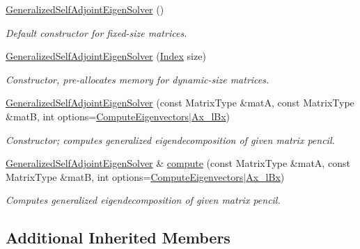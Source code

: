 \begin{DoxyCompactItemize}
\hyperlink{group___eigenvalues___module_a501effdbf722c0609ea05ff3fd4cc721}{Generalized\+Self\+Adjoint\+Eigen\+Solver} ()
\begin{DoxyCompactList}\small\item\em Default constructor for fixed-\/size matrices. \end{DoxyCompactList}\item 
\hyperlink{group___eigenvalues___module_aac849f01a8c6148c645acd10bd3a9b0e}{Generalized\+Self\+Adjoint\+Eigen\+Solver} (\hyperlink{group___eigenvalues___module_a8a59ab7734b6eae2754fd78bc7c3a360}{Index} size)
\begin{DoxyCompactList}\small\item\em Constructor, pre-\/allocates memory for dynamic-\/size matrices. \end{DoxyCompactList}\item 
\hyperlink{group___eigenvalues___module_addc0409c9cb1a5ac9cbbd00efe68908e}{Generalized\+Self\+Adjoint\+Eigen\+Solver} (const Matrix\+Type \&matA, const Matrix\+Type \&matB, int options=\hyperlink{group__enums_ggae3e239fb70022eb8747994cf5d68b4a9ada93d8885bde32b876ba4af01d3292cc}{Compute\+Eigenvectors}$\vert$\hyperlink{group__enums_ggae3e239fb70022eb8747994cf5d68b4a9a1a7cefbb22c2c3928d246b753cf53633}{Ax\+\_\+l\+Bx})
\begin{DoxyCompactList}\small\item\em Constructor; computes generalized eigendecomposition of given matrix pencil. \end{DoxyCompactList}\item 
\hyperlink{group___eigenvalues___module_class_eigen_1_1_generalized_self_adjoint_eigen_solver}{Generalized\+Self\+Adjoint\+Eigen\+Solver} \& \hyperlink{group___eigenvalues___module_afe3f89bbcf982b534e5d4d3b1f58cdc2}{compute} (const Matrix\+Type \&matA, const Matrix\+Type \&matB, int options=\hyperlink{group__enums_ggae3e239fb70022eb8747994cf5d68b4a9ada93d8885bde32b876ba4af01d3292cc}{Compute\+Eigenvectors}$\vert$\hyperlink{group__enums_ggae3e239fb70022eb8747994cf5d68b4a9a1a7cefbb22c2c3928d246b753cf53633}{Ax\+\_\+l\+Bx})
\begin{DoxyCompactList}\small\item\em Computes generalized eigendecomposition of given matrix pencil. \end{DoxyCompactList}\end{DoxyCompactItemize}
\subsection*{Additional Inherited Members}


